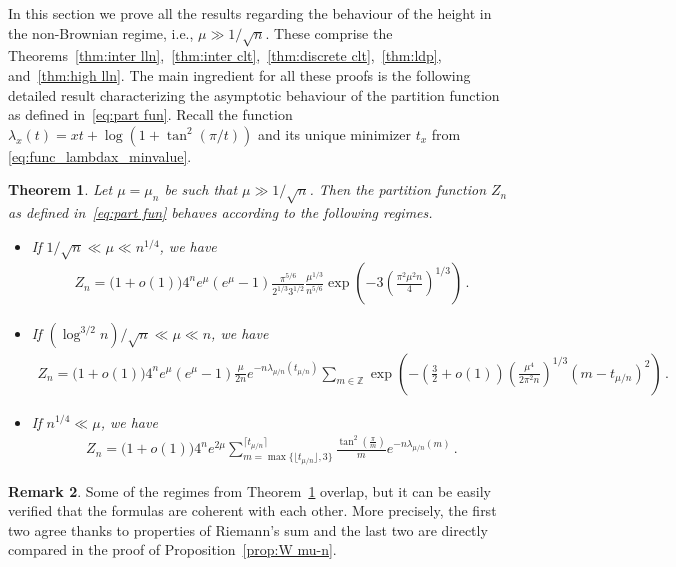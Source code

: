 \documentclass{article}
\newcommand{\1}{\mathbbm{1}}								%
\newtheorem{theorem}{Theorem}[section]
\theoremstyle{definition}
\newtheorem{remark}[theorem]{Remark}
\numberwithin{equation}{section}
\newcommand{\Z}{\mathbb Z}
\newcommand{\numitem}[1]{$\mathbf{(#1)}$}
\begin{document}
In this section we prove all the results regarding the behaviour of the height in the non-Brownian regime, i.e., $\mu\gg 1/\sqrt{n}$. These comprise the Theorems~\ref{thm:inter lln},~\ref{thm:inter clt},~\ref{thm:discrete clt},~\ref{thm:ldp}, and~\ref{thm:high lln}.
The main ingredient for all these proofs is the following detailed result characterizing the asymptotic behaviour of the partition function as defined in~\eqref{eq:part fun}. {Recall the function $\lambda_x(t)=xt+\log(1+\tan^2(\pi/t))$ and its unique minimizer $t_x$ from \eqref{eq:func_lambdax_minvalue}.}

\begin{theorem}\label{thm:part-fun}
    Let $\mu=\mu_n$ be such that $\mu\gg1/\sqrt{n}$. Then the partition function $Z_n$ as defined in~\eqref{eq:part fun} behaves according to the following regimes.
    \begin{itemize}
        \item[\numitem{1}] If $1/\sqrt{n}\ll\mu\ll n^{1/4}$, we have
        \begin{align*}
            Z_n=\big(1+o(1)\big)4^ne^\mu(e^\mu-1)\frac{\pi^{5/6}}{2^{1/3}3^{1/2}}\frac{\mu^{1/3}}{n^{5/6}}\exp\left(-3\left(\frac{\pi^2\mu^2n}{4}\right)^{1/3}\right)\,.
        \end{align*}
        \item[\numitem{2}] If $(\log^{3/2}n)/\sqrt{n}\ll\mu\ll n$, we have
        \begin{align*}
            Z_n=\big(1+o(1)\big)4^ne^{\mu}(e^\mu-1)\frac{\mu}{2n}e^{-n\lambda_{\mu/n}(t_{\mu/n})}\sum_{m\in\Z}\exp\left(-\left(\frac{3}{2}+o(1)\right)\left(\frac{\mu^4}{2\pi^2n}\right)^{1/3}(m-t_{\mu/n})^2\right)\,.
        \end{align*}
        \item[\numitem{3}] If $n^{1/4}\ll\mu$, we have
        \begin{align*}
            Z_n=\big(1+o(1)\big)4^ne^{2\mu}\sum_{m=\max\{\lfloor t_{\mu/n}\rfloor,3\}}^{\lceil t_{\mu/n}\rceil}\frac{\tan^2\left(\frac{\pi}{m}\right)}{m}e^{-n\lambda_{\mu/n}(m)}\,.
        \end{align*}
    \end{itemize}
    
\end{theorem}

\begin{remark}
    Some of the regimes from Theorem~\ref{thm:part-fun} overlap, but it can be easily verified that the formulas are coherent with each other.
    More precisely, the first two agree thanks to properties of Riemann's sum and the last two are directly compared in the proof of Proposition~\ref{prop:W mu-n}.
\end{remark}
\end{document}
